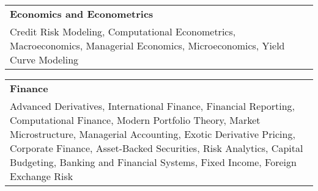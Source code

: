 \documentclass[10pt, letterpaper]{article}
\newcommand{\tabularxwidth}{\textwidth}
\begin{document}
            \vspace{.5em}
        

    
        \begin{tabularx}{\tabularxwidth}{X}
            \textbf{Economics and Econometrics} \\
            
            Credit Risk Modeling, 
            Computational Econometrics, 
            Macroeconomics, 
            Managerial Economics, 
            Microeconomics, 
            Yield Curve Modeling \\
        \end{tabularx}

        
            \vspace{.5em}
        

    
        \begin{tabularx}{\tabularxwidth}{X}
            \textbf{Finance} \\
            
            Advanced Derivatives, 
            International Finance, 
            Financial Reporting, 
            Computational Finance, 
            Modern Portfolio Theory, 
            Market Microstructure, 
            Managerial Accounting, 
            Exotic Derivative Pricing, 
            Corporate Finance, 
            Asset-Backed Securities, 
            Risk Analytics, 
            Capital Budgeting, 
            Banking and Financial Systems, 
            Fixed Income, 
            Foreign Exchange Risk \\
        \end{tabularx}

        
            \vspace{.5em}
        
\end{document}
